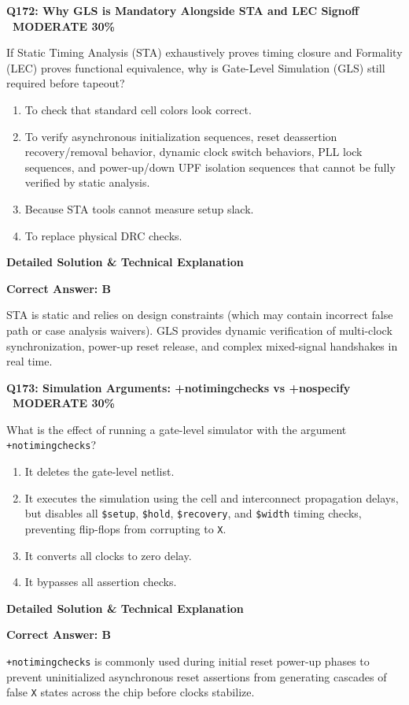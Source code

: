 \documentclass[11pt,a4paper]{article}
\newcommand{\badgemod}{{\color{white}\colorbox{modoran}{\bfseries\sffamily\tiny\ MODERATE 30\%\ }}}
\newenvironment{qbox}[2]{%
  \begin{mdframed}[style=qstyle]%
  {\bfseries\sffamily\color{primaryblue}#1 \hfill #2}\par\vspace{2pt}%
}{%
  \end{mdframed}%
}
\newenvironment{ansbox}{%
  \begin{mdframed}[style=ansstyle]%
  {\bfseries\sffamily\color{ansgreen}\small Detailed Solution \& Technical Explanation}\par\vspace{2pt}\small%
}{%
  \end{mdframed}%
}
\begin{document}
\begin{qbox}{Q172: Why GLS is Mandatory Alongside STA and LEC Signoff}{\badgemod}
If Static Timing Analysis (STA) exhaustively proves timing closure and Formality (LEC) proves functional equivalence, why is Gate-Level Simulation (GLS) still required before tapeout?
\begin{enumerate}[label=\textbf{\Alph*.}]
  \item To check that standard cell colors look correct.
  \item To verify asynchronous initialization sequences, reset deassertion recovery/removal behavior, dynamic clock switch behaviors, PLL lock sequences, and power-up/down UPF isolation sequences that cannot be fully verified by static analysis.
  \item Because STA tools cannot measure setup slack.
  \item To replace physical DRC checks.
\end{enumerate}
\end{qbox}
\begin{ansbox}
\textbf{Correct Answer: B}

STA is static and relies on design constraints (which may contain incorrect false path or case analysis waivers). GLS provides dynamic verification of multi-clock synchronization, power-up reset release, and complex mixed-signal handshakes in real time.
\end{ansbox}

\begin{qbox}{Q173: Simulation Arguments: +notimingchecks vs +nospecify}{\badgemod}
What is the effect of running a gate-level simulator with the argument \texttt{+notimingchecks}?
\begin{enumerate}[label=\textbf{\Alph*.}]
  \item It deletes the gate-level netlist.
  \item It executes the simulation using the cell and interconnect propagation delays, but disables all \texttt{\$setup}, \texttt{\$hold}, \texttt{\$recovery}, and \texttt{\$width} timing checks, preventing flip-flops from corrupting to \texttt{X}.
  \item It converts all clocks to zero delay.
  \item It bypasses all assertion checks.
\end{enumerate}
\end{qbox}
\begin{ansbox}
\textbf{Correct Answer: B}

\texttt{+notimingchecks} is commonly used during initial reset power-up phases to prevent uninitialized asynchronous reset assertions from generating cascades of false \texttt{X} states across the chip before clocks stabilize.
\end{ansbox}
\end{document}
